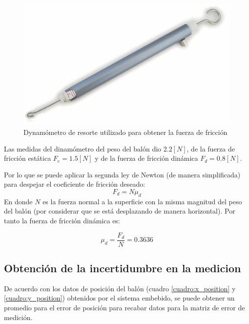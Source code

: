\begin{figure}
\centering
\includegraphics[scale=0.4]{images/dynamometer.jpg}
\caption{Dynamómetro de resorte utilizado para obtener la fuerza de fricción}
\label{fig:dynamometer}
\end{figure}	

	Las medidas del dinamómetro del peso del balón dio $2.2[N]$, de la fuerza de fricción estática $F_{e} = 1.5[N]$ y de la fuerza de fricción dinámica $F_{d} = 0.8[N]$. 

	Por lo que se puede aplicar la segunda ley de Newton (de manera simplificada) para despejar el coeficiente de fricción deseado:
\begin{equation}
F_d = N\mu_d 
\end{equation}
	En donde $N$ es la fuerza normal a la superficie con la misma magnitud del peso del balón (por considerar que se está desplazando de manera horizontal). Por tanto la fuerza de fricción dinámica es:
	
\begin{equation}
	\mu_d = \frac{F_d}{N}
	      = 0.3636		
\end{equation}
	
		\subsection*{Obtención de la incertidumbre en la medicion}
	De acuerdo con los datos de posición del balón (cuadro \ref{cuadro:x_position} y \ref{cuadro:y_position}) obtenidos por el sistema embebido, se puede obtener un promedio para el error de posición para recabar datos para la matriz de error de medición.

